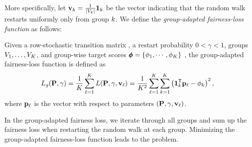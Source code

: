 \documentclass[sigconf, anonymous, review]{acmart}
\begin{document}
More specifically, let $\mathbf{{v}}_k = \frac{1}{|V_k|} \mathbf{{1}}_{k}$ be 
the vector indicating that the random walk restarts uniformly only from group $k$. 
We define the \emph{group-adapted fairness-loss function} as follows:

\begin{definition}
\label{definition:groupfairloss}
Given a row-stochastic transition matrix \transmatrix, 
a restart probability $0 < \gamma < 1$, 
groups $V_1, \ldots, V_K$, and 
group-wise target \pagerank scores $\pmb{\phi} = \{\phi_1,\cdots, \phi_{K}\}$
, 
the group-adapted fairness-loss function is defined as 
\begin{equation}
\label{equation:cgfl}
    L_{\mathit{g}}(\mathbf{{P}}, \gamma)  
        = \frac{1}{K} \sum_{\ell=1}^K L(\mathbf{{P}}, \gamma, \mathbf{{v}}_{\ell})
        = \frac{1}{K^2} \sum_{\ell=1}^K \sum_{k=1}^K 
                \left(\mathbf{{1}}_{k}^{\mathsf{T}} \mathbf{{p}}_\ell - \phi_k\right)^2,
\end{equation}
where $\mathbf{{p}}_\ell$ is the \pagerank vector with respect to parameters 
$(\mathbf{{P}}, \gamma, \mathbf{{v}}_{\ell})$.
\end{definition}

In the group-adapted fairness loss, 
we iterate through all groups and sum up the fairness loss 
when restarting the random walk at each group. 
Minimizing the group-adapted fairness-loss function 
leads to the \gaphiPageRank problem.

\end{document}
